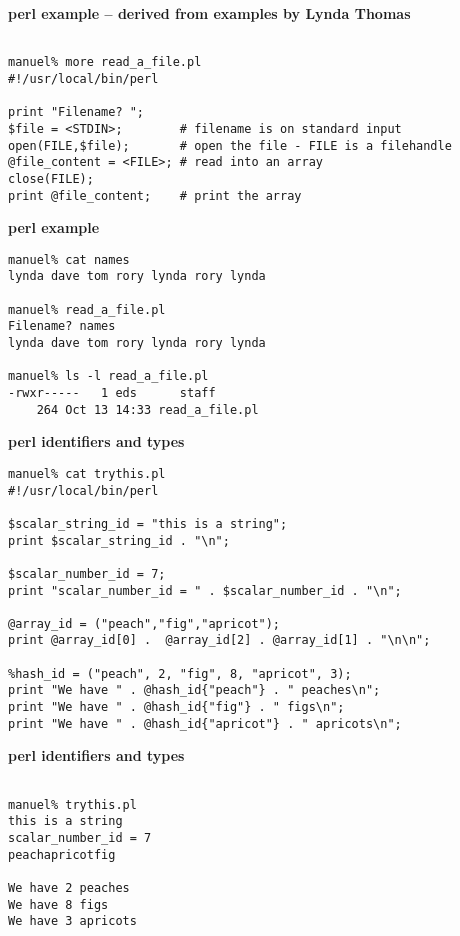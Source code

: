 %
%
\begin{slide}{}
{\small
{\bf perl example -- derived from examples by Lynda Thomas}

\begin{verbatim}

manuel% more read_a_file.pl
#!/usr/local/bin/perl

print "Filename? ";
$file = <STDIN>;        # filename is on standard input
open(FILE,$file);       # open the file - FILE is a filehandle
@file_content = <FILE>; # read into an array
close(FILE);
print @file_content;    # print the array

\end{verbatim}
}
\end{slide}

%
%
\begin{slide}{}
{\bf perl example}

\begin{verbatim}
manuel% cat names
lynda dave tom rory lynda rory lynda

manuel% read_a_file.pl
Filename? names
lynda dave tom rory lynda rory lynda

manuel% ls -l read_a_file.pl
-rwxr-----   1 eds      staff        
    264 Oct 13 14:33 read_a_file.pl

\end{verbatim}
\end{slide}

%
%
\begin{slide}{}
{\small
{\bf perl identifiers and types}

\begin{verbatim}
manuel% cat trythis.pl
#!/usr/local/bin/perl

$scalar_string_id = "this is a string";  
print $scalar_string_id . "\n";

$scalar_number_id = 7;
print "scalar_number_id = " . $scalar_number_id . "\n";

@array_id = ("peach","fig","apricot");
print @array_id[0] .  @array_id[2] . @array_id[1] . "\n\n";

%hash_id = ("peach", 2, "fig", 8, "apricot", 3);
print "We have " . @hash_id{"peach"} . " peaches\n";
print "We have " . @hash_id{"fig"} . " figs\n";
print "We have " . @hash_id{"apricot"} . " apricots\n";

\end{verbatim}
}
\end{slide}

%
%
\begin{slide}{}
{\bf perl identifiers and types}

\begin{verbatim}

manuel% trythis.pl
this is a string
scalar_number_id = 7
peachapricotfig

We have 2 peaches
We have 8 figs
We have 3 apricots

\end{verbatim}
\end{slide}

